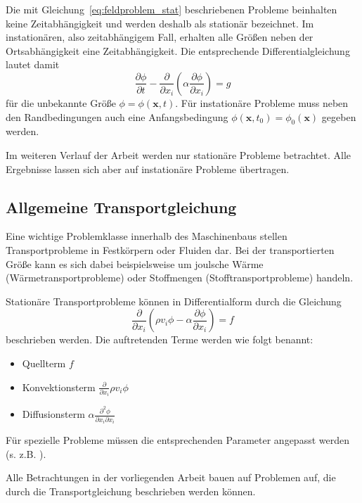 Die mit Gleichung~\eqref{eq:feldproblem_stat} beschriebenen Probleme beinhalten keine Zeitabhängigkeit
und werden deshalb als stationär bezeichnet.
Im instationären, also zeitabhängigem Fall, erhalten alle Größen neben der Ortsabhängigkeit
eine Zeitabhängigkeit. Die entsprechende Differentialgleichung lautet damit
\begin{equation}
  \frac{\partial \phi}{\partial t}
  -\frac{\partial}{\partial x_i}\left({\alpha \frac{\partial \phi}{\partial x_i} }\right)=g
  \label{eq:feldproblem_instat}
\end{equation}
für die unbekannte Größe $\phi=\phi(\mathbf{x}, t)$.
Für instationäre Probleme muss neben den Randbedingungen auch eine Anfangsbedingung
$\phi(\mathbf{x}, t_0) = \phi_0(\mathbf{x})$ gegeben werden.

Im weiteren Verlauf der Arbeit werden nur stationäre Probleme betrachtet. Alle Ergebnisse
lassen sich aber auf instationäre Probleme übertragen.

\subsection{Allgemeine Transportgleichung}
\label{sec:transportgl}

Eine wichtige Problemklasse innerhalb des Maschinenbaus stellen Transportprobleme in
Festkörpern oder Fluiden dar. Bei der transportierten Größe kann es sich dabei beispielsweise
um joulsche Wärme (Wärmetransportprobleme) oder Stoffmengen (Stofftransportprobleme) handeln.

Stationäre Transportprobleme können in Differentialform durch die Gleichung
\begin{equation}
  \frac{\partial}{\partial x_i} \left({\rho v_i \phi
- \alpha \frac{\partial \phi}{\partial x_i} }\right) = f
\label{eq:transportgl}
\end{equation}
beschrieben werden. Die auftretenden Terme werden wie folgt benannt:
\begin{itemize}
  \item Quellterm $f$
  \item Konvektionsterm $\frac{\partial}{\partial x_i} \rho v_i \phi$
  \item Diffusionsterm $\alpha \frac{\partial^2 \phi}{\partial x_i \partial x_i}$
\end{itemize}
Für spezielle Probleme müssen die entsprechenden Parameter angepasst werden (s. z.B. \cite{num_maschbau}).

Alle Betrachtungen in der vorliegenden Arbeit bauen auf Problemen auf, die durch die
Transportgleichung beschrieben werden können.

